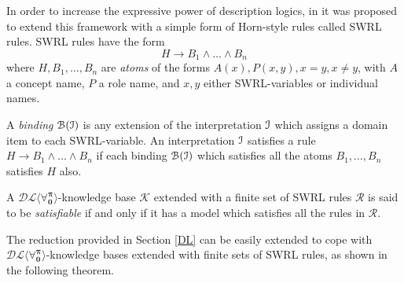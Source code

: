 \documentclass[a4paper,UKenglish]{lipics}
\newcommand{\Lang}{\ensuremath{\mathbf{\forall_{0}^{\pi}}}\xspace}
\newcommand{\dlLang}{\ensuremath{\mathcal{DL\langle}\Lang\mathcal{\rangle}}\xspace}
\begin{document}
In order to increase the expressive power of description logics, in
\cite{HorPat2004} it was proposed to extend this framework with a
simple form of Horn-style rules called \textsf{SWRL} rules.  \textsf{SWRL}
rules have the form
\[
 H \rightarrow B_1 \wedge \ldots \wedge B_n
\]
where $H, B_1, \ldots, B_n$ are \emph{atoms} of the forms $A(x),
P(x,y), x=y, x\neq y$, with $A$ a concept name, $P$ a role
name, and $x,y$ either \textsf{SWRL}-variables or individual names.

A \emph{binding} $\mathcal{B}(\mathcal{I})$ is any extension of
the interpretation $\mathcal{I}$ which assigns a domain item to each
\textsf{SWRL}-variable. An interpretation $\mathcal{I}$ satisfies a rule
$H \rightarrow B_1 \wedge \ldots \wedge B_n$ if each
binding $\mathcal{B}(\mathcal{I})$ which satisfies all the atoms
$B_1, \ldots, B_n$ satisfies $H$ also.

A \dlLang-knowledge base $\mathcal{K}$ extended with
a finite set of \textsf{SWRL} rules $\mathcal{R}$ is said to be
\emph{satisfiable} if and only if it has a model
which satisfies all the rules in $\mathcal{R}$.

The reduction provided in Section \ref{DL} can be
easily extended to cope with \dlLang-knowledge bases extended
with finite sets of \textsf{SWRL} rules, as shown in the following theorem.
\end{document}

